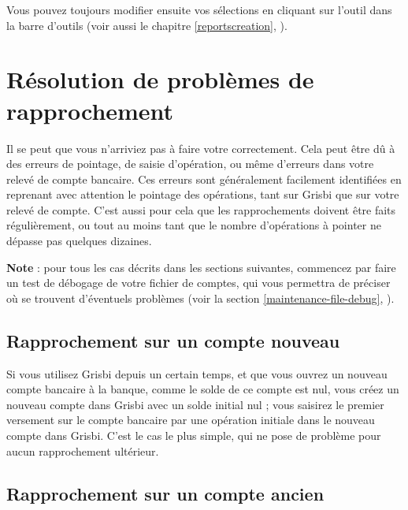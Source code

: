 Vous pouvez toujours modifier ensuite vos sélections en cliquant sur l'outil  dans la barre d'outils (voir aussi le chapitre \vref{reportscreation}, ).


\section{Résolution de problèmes de rapprochement\label{reconciliation-solve}}


Il se peut que vous n'arriviez pas à faire votre  correctement. Cela peut être dû à des erreurs de pointage, de saisie d'opération, ou même d'erreurs dans votre relevé de compte bancaire. Ces erreurs sont généralement facilement identifiées en reprenant avec attention le pointage des opérations, tant sur Grisbi que sur votre relevé de compte. C'est aussi pour cela que les rapprochements doivent être faits régulièrement, ou tout au moins tant que le nombre d'opérations à pointer ne dépasse pas quelques dizaines.

\textbf{Note} : pour tous les cas décrits dans les sections suivantes, commencez par faire un test de débogage de votre fichier de comptes, qui vous permettra de préciser où se trouvent d'éventuels problèmes (voir la section \vref{maintenance-file-debug}, ).


\subsection{Rapprochement sur un compte nouveau\label{reconciliation-solve-new}}

Si vous utilisez Grisbi depuis un certain temps, et que vous ouvrez un nouveau compte bancaire à la banque, comme le solde de ce compte est nul, vous créez un nouveau compte dans Grisbi avec un solde initial nul ; vous saisirez le premier versement sur le compte bancaire par une opération initiale dans le nouveau compte dans Grisbi. C'est le cas le plus simple, qui ne pose de problème pour aucun rapprochement ultérieur.


\subsection{Rapprochement sur un compte ancien\label{reconciliation-solve-old}}

